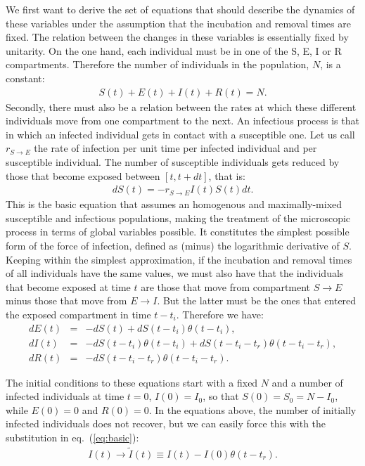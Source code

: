 \documentclass[a4paper,oneside,11pt]{article}
\begin{document}
We first want to derive the set of equations that should describe the dynamics of these variables under the assumption that the incubation and removal times are fixed. The relation between the changes in these variables is essentially fixed by unitarity. On the one hand, each individual must be in one of the S, E, I or R compartments. Therefore the number of  individuals in the population, $N$, is a constant:
\begin{eqnarray}
S(t)+ E(t)+I(t)+R(t) = N.
\end{eqnarray}
Secondly, there must also be a relation between the rates at which these different individuals move from one {compartment} to the next. An infectious process is that in which an infected individual gets in contact with a susceptible one. Let us call $r_{S\rightarrow E}$ the rate of infection per unit time
per infected individual and per susceptible individual. The number of susceptible individuals gets reduced by those that become exposed between $[t, t+dt]$, that is:
\begin{eqnarray}
d S(t) = - r_{S\rightarrow E} I(t) S(t) dt.
\label{eq:basic}
\end{eqnarray}
This is the basic equation that assumes an homogenous and maximally-mixed susceptible and infectious populations, making the treatment of the microscopic process in terms of global variables possible. It 
 constitutes the simplest possible form of the force of infection, defined as (minus) the logarithmic derivative of $S$. 
Keeping within the simplest approximation, if the incubation and removal times of all individuals have the same values, we must also have that the individuals that become exposed at time
$t$ are those that move from compartment $S\rightarrow E$  minus those that move from $E\rightarrow I$. But the latter must be the ones that entered the exposed compartment in time $t-t_i$. Therefore we have:
\begin{eqnarray}
d E(t) &=& -d S(t) + d S(t-t_i) \theta(t-t_i) ,\nonumber\\
d I(t) &=& -d S(t-t_i) \theta(t-t_i)+ d S(t-t_i-t_r) \theta(t-t_i-t_r),\label{eqs:cor}\\
d R(t) &=& - d S(t - t_i - t_r) \theta(t-t_i-t_r).\nonumber
\end{eqnarray}

The initial conditions to these equations start with a fixed $N$ and a number of infected individuals at time $t=0$, $I(0)= I_0$, so that $S(0)=S_0 = N-I_0$, while $E(0)=0$ and $R(0)=0$.
In the  equations above, the number of initially infected individuals does not recover, but we can easily force this with the substitution in eq.~(\ref{eq:basic}):
\begin{eqnarray}
I(t) \rightarrow \tilde{I}(t) \equiv I(t) - I(0) \theta(t-t_r).
\end{eqnarray}
\end{document}
